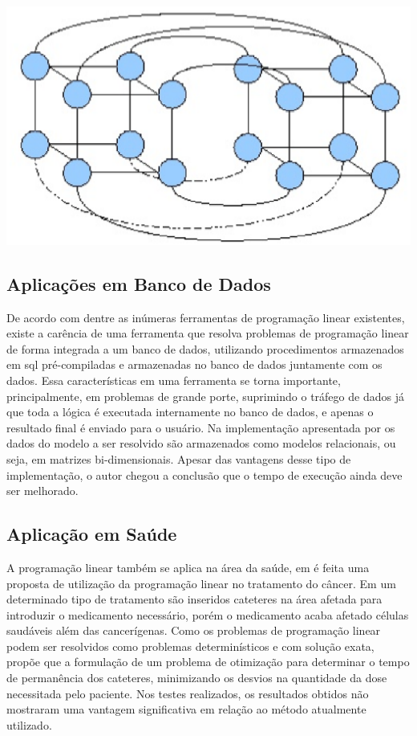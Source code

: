 \begin{center}
	\includegraphics[scale=0.5]{graficos/hipercubo}
	\label{img:hipercubo}
\end{center}

\subsection{Aplicações em Banco de Dados}
De acordo com  dentre as inúmeras ferramentas de programação linear existentes, existe a carência de uma ferramenta que resolva problemas de programação linear de forma integrada a um banco de dados, utilizando procedimentos armazenados em sql pré-compiladas e armazenadas no banco de dados juntamente com os dados. Essa características em uma ferramenta se torna importante, principalmente, em problemas de grande porte, suprimindo o tráfego de dados já que toda a lógica é executada internamente no banco de dados, e apenas o resultado final é enviado para o usuário. Na implementação apresentada por  os dados do modelo a ser resolvido são armazenados como modelos relacionais, ou seja, em matrizes bi-dimensionais. Apesar das vantagens desse tipo de implementação, o autor chegou a conclusão que o tempo de execução ainda deve ser melhorado.

\subsection{Aplicação em Saúde}
A programação linear também se aplica na área da saúde, em  é feita uma proposta de utilização da programação linear no tratamento do câncer. 
Em um determinado tipo de tratamento são inseridos cateteres na área afetada para introduzir o medicamento necessário, porém o medicamento acaba afetado células saudáveis além das cancerígenas. Como os problemas de programação linear podem ser resolvidos como problemas determinísticos e com solução exata,  propõe que a formulação de um problema de otimização para determinar o tempo de permanência dos cateteres, minimizando os desvios na quantidade da dose necessitada pelo paciente. Nos testes realizados, os resultados obtidos não mostraram uma vantagem significativa em relação ao método atualmente utilizado.

